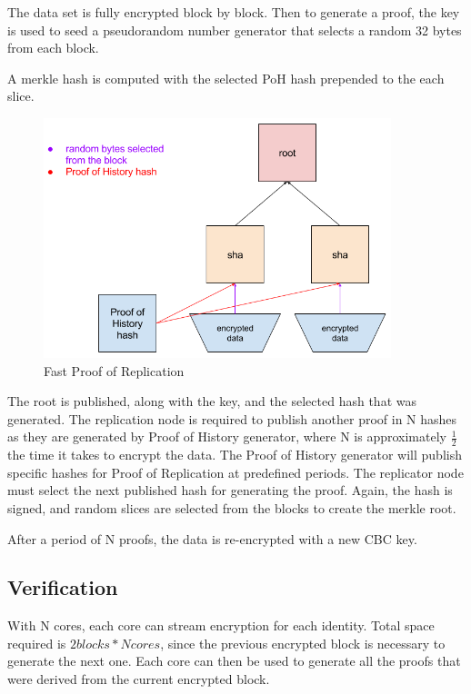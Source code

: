 \documentclass[12pt]{article}
\begin{document}
The data set is fully encrypted block by block. Then to generate a proof, the key is used to seed a pseudorandom number generator that selects a random 32 bytes from each block.

A merkle hash is computed with the selected PoH hash prepended to the each slice.

\begin{figure}[h]
  \begin{center}
    \centering
    \includegraphics[width=0.9\textwidth]{figures/por_001.png}
    \caption[Fig 8]{Fast Proof of Replication\label{fig_8}}
  \end{center}
  \end{figure}

The root is published, along with the key, and the selected hash that was generated. The replication node is required to publish another proof in N hashes as they are generated by Proof of History generator, where N is approximately \(\frac{1}{2}\) the time it takes to encrypt the data. The Proof of History generator will publish specific hashes for Proof of Replication at predefined periods. The replicator node must select the next published hash for generating the proof. Again, the hash is signed, and random slices are selected from the blocks to create the merkle root.

After a period of N proofs, the data is re-encrypted with a new CBC key.
\subsection{Verification}

With N cores, each core can stream encryption for each identity. Total space required is \(2 blocks * N cores\), since the previous encrypted block is necessary to generate the next one. Each core can then be used to generate all the proofs that were derived from the current encrypted block.
\end{document}
